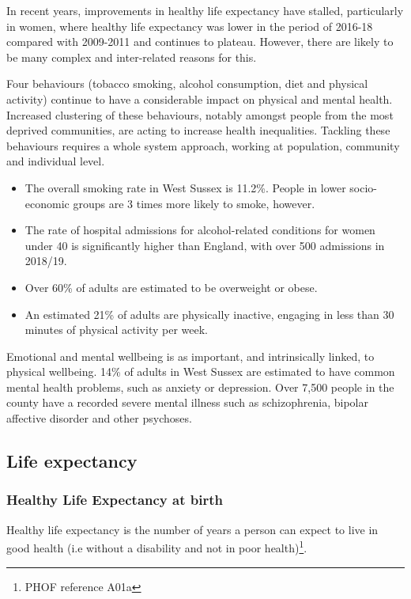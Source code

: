 In recent years, improvements in healthy life expectancy have stalled, particularly in women, where healthy life expectancy was lower in the period of 2016-18 compared with 2009-2011 and continues to plateau. However, there are likely to be many complex and inter-related reasons for this.

Four behaviours (tobacco smoking, alcohol consumption, diet and physical activity) continue to have a considerable impact on physical and mental health. Increased clustering of these behaviours, notably amongst people from the most deprived communities, are acting to increase health inequalities. Tackling these behaviours requires a whole system approach, working at population, community and individual level.

\begin{itemize}[noitemsep]
    \item The overall smoking rate in West Sussex is 11.2\%. People in lower socio-economic groups are 3 times more likely to smoke, however.
    \item The rate of hospital admissions for alcohol-related conditions for women under 40 is significantly higher than England, with over 500 admissions in 2018/19.
    \item Over 60\% of adults are estimated to be overweight or obese.
    \item An estimated 21\% of adults are physically inactive, engaging in less than 30 minutes of physical activity per week.
\end{itemize}

Emotional and mental wellbeing is as important, and intrinsically linked, to physical wellbeing. 14\% of adults in West Sussex are estimated to have common mental health problems, such as anxiety or depression. Over 7,500 people in the county have a recorded severe mental illness such as schizophrenia, bipolar affective disorder and other psychoses.

\subsection{Life expectancy}
\subsubsection{Healthy Life Expectancy at birth} Healthy life expectancy is the number of years a person can expect to live in good health (i.e without a disability and not in poor health)\footnote{PHOF reference A01a}.

